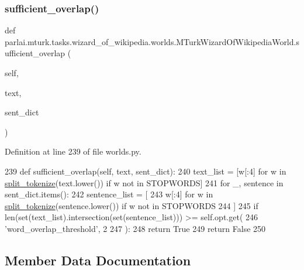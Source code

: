 \subsubsection{\texorpdfstring{sufficient\+\_\+overlap()}{sufficient\_overlap()}}
{\footnotesize\ttfamily def parlai.\+mturk.\+tasks.\+wizard\+\_\+of\+\_\+wikipedia.\+worlds.\+M\+Turk\+Wizard\+Of\+Wikipedia\+World.\+sufficient\+\_\+overlap (\begin{DoxyParamCaption}\item[{}]{self,  }\item[{}]{text,  }\item[{}]{sent\+\_\+dict }\end{DoxyParamCaption})}



Definition at line 239 of file worlds.\+py.


\begin{DoxyCode}
239     \textcolor{keyword}{def }sufficient\_overlap(self, text, sent\_dict):
240         text\_list = [w[:4] \textcolor{keywordflow}{for} w \textcolor{keywordflow}{in} \hyperlink{namespaceparlai_1_1mturk_1_1tasks_1_1wizard__of__wikipedia_1_1worlds_a040aaf5ecfbddec14f321279454f85a8}{split\_tokenize}(text.lower()) \textcolor{keywordflow}{if} w \textcolor{keywordflow}{not} \textcolor{keywordflow}{in} STOPWORDS]
241         \textcolor{keywordflow}{for} \_, sentence \textcolor{keywordflow}{in} sent\_dict.items():
242             sentence\_list = [
243                 w[:4] \textcolor{keywordflow}{for} w \textcolor{keywordflow}{in} \hyperlink{namespaceparlai_1_1mturk_1_1tasks_1_1wizard__of__wikipedia_1_1worlds_a040aaf5ecfbddec14f321279454f85a8}{split\_tokenize}(sentence.lower()) \textcolor{keywordflow}{if} w \textcolor{keywordflow}{not} \textcolor{keywordflow}{in} STOPWORDS
244             ]
245             \textcolor{keywordflow}{if} len(set(text\_list).intersection(set(sentence\_list))) >= self.opt.get(
246                 \textcolor{stringliteral}{'word\_overlap\_threshold'}, 2
247             ):
248                 \textcolor{keywordflow}{return} \textcolor{keyword}{True}
249         \textcolor{keywordflow}{return} \textcolor{keyword}{False}
250 
\end{DoxyCode}


\subsection{Member Data Documentation}
\mbox{\label{classparlai_1_1mturk_1_1tasks_1_1wizard__of__wikipedia_1_1worlds_1_1MTurkWizardOfWikipediaWorld_a1d8322b60328d9bee28d25ff2b55db27}} 

